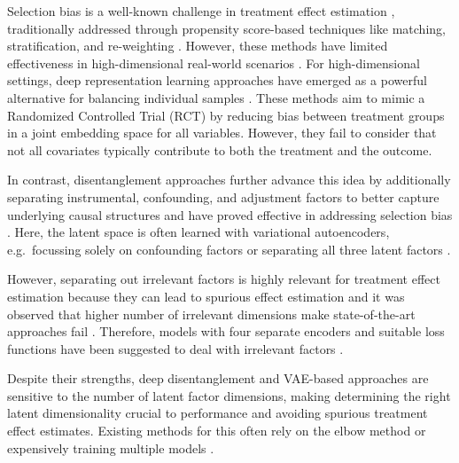 \documentclass[doubleblind]{ecai}
\begin{document}
	Selection bias is a well-known challenge in treatment effect estimation \citep{PaulRD}, traditionally addressed through propensity score-based techniques like matching, stratification, and re-weighting \citep{PaulRD,PaulR,Sheng}. However, these methods have limited effectiveness in high-dimensional real-world scenarios \citep{conf}. For high-dimensional settings, deep representation learning approaches have emerged as a powerful alternative for balancing individual samples \citep{Johansson,UriSha,SITE,Negar_2}. These methods aim to mimic a Randomized Controlled Trial (RCT) by reducing bias between treatment groups in a joint embedding space for all variables. However, they fail to consider that not all covariates typically contribute to both the treatment and the outcome.
	
	In contrast, disentanglement approaches further advance this idea by additionally separating instrumental, confounding, and adjustment factors to better capture underlying causal structures and have proved effective in addressing selection bias \citep{Decomp,Negar,kuang2020data,Anpeng,Ortho}. Here, the latent space is often learned with variational autoencoders, e.g.\ focussing solely on confounding factors \citep{CEVAE} or separating all three latent factors \citep{TEDEV}.
	
	However, separating out irrelevant factors is highly relevant for treatment effect estimation because they can lead to spurious effect estimation and it was observed that higher number of irrelevant dimensions make state-of-the-art approaches fail \citep{Khan2024OnTE}. Therefore, models with four separate encoders and suitable loss functions have been suggested to deal with irrelevant factors \citep{vowels2021targeted,Khan2024OnTE}. 
	
	Despite their strengths, deep disentanglement and VAE-based approaches are sensitive to the number of latent factor dimensions, making determining the right latent dimensionality crucial to performance and avoiding spurious treatment effect estimates. Existing methods for this often rely on the elbow method or expensively training multiple models \citep{Mai,doersch2021tutorialvariationalautoencoders,FONDUE}.
	
\end{document}
